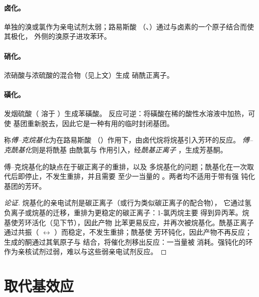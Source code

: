 \paragraph{卤化。} 单独的溴或氯作为亲电试剂太弱；路易斯酸
（、）通过与卤素的一个原子结合而使其极化，
外侧的溴原子进攻苯环。

\paragraph{硝化。} 浓硝酸与浓硫酸的混合物（见上文）生成
硝酰正离子。

\paragraph{磺化。} 发烟硫酸（ 溶于 ）生成苯磺酸。
反应可逆：将磺酸在稀的酸性水溶液中加热，可使
 基团重新脱去，因此它是一种有用的临时封闭基团。

\begin{definition}[傅–克反应]\label{def:b2:aromatic-substitution:friedel-crafts}
称\emph{傅–克烷基化}为在路易斯酸
（）作用下，由卤代烷将烷基引入芳环的反应。
\emph{傅–克酰基化}则是将酰基
 由酰氯与  作用引入，经\emph{酰基正离子}
，生成芳基酮。
\end{definition}

\begin{proposition}[傅–克反应的局限性]\label{prop:b2:aromatic-substitution:friedel-crafts-limits}
傅–克烷基化的缺点在于碳正离子的重排，以及
多烷基化的问题；酰基化在一次取代后即停止，不发生重排，并且需要
至少一当量的 。两者均不适用于带有强
钝化基团的芳环。
\end{proposition}

\begin{proof}[论证]
烷基化的亲电试剂是碳正离子（或行为类似碳正离子的配合物），
它通过氢负离子或烷基的迁移，重排为更稳定的碳正离子：1-氯丙烷主要
得到异丙苯。烷基使芳环活化（见下节），因此产物
比苯更易反应，并再次被烷基化。酰基正离子
通过共振（ $\leftrightarrow$ ）而稳定，不发生重排；酰基使
芳环钝化，因此产物不再反应；生成的酮通过其氧原子与
 结合，将催化剂移出反应：一当量被
消耗。强钝化的环作为亲核试剂过弱，难以与这些弱亲电试剂反应。
\end{proof}

\section{取代基效应}

